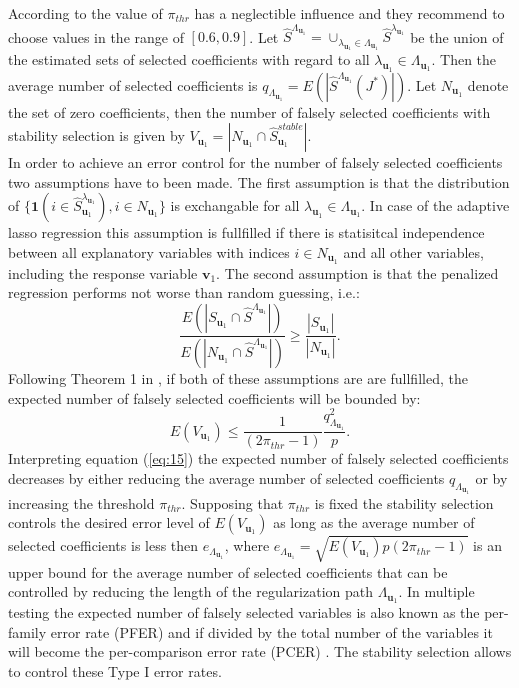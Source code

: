 According to \citet{Meinshausen2010} the value of $\pi_{thr}$ has a neglectible influence and they recommend to choose values in the range of $[0.6,0.9]$. Let $\hat{S}^{\Lambda_{\mathbf{u}_{1}}}= \cup_{\lambda_{\mathbf{u}_{1}} \in \Lambda_{\mathbf{u}_{1}}} \hat{S}^{\lambda_{\mathbf{u}_{1}}}$ be
the union of the estimated sets of selected coefficients with regard to all $\lambda_{\mathbf{u}_{1}} \in \Lambda_{\mathbf{u}_{1}}$.
Then the average number of selected coefficients is $q_{\Lambda_{\mathbf{u}_{1}}}=E(|\hat{S}^{\Lambda_{\mathbf{u}_{1}}}(J^{*})|)$. 
Let $N_{\mathbf{u}_{1}}$ denote the set of zero coefficients, then the number of falsely selected coefficients with stability selection is given by $V_{\mathbf{u}_{1}}=|N_{\mathbf{u}_{1}}\cap\hat{S}_{\mathbf{u}_{1}}^{stable}|$. \\
In order to achieve an error control for the number of falsely selected coefficients two assumptions have to been made. The first assumption is that the distribution of $\{\mathbf{1}(i \in \hat{S}^{\lambda_{\mathbf{u}_{1}}}_{\mathbf{u}_{1}}),i \in N_{\mathbf{u}_{1}}\}$ is exchangable for all $\lambda_{\mathbf{u}_{1}} \in \Lambda_{\mathbf{u}_{1}}$. In case of the adaptive lasso regression this assumption is fullfilled if there is statisitcal independence between all explanatory variables with indices $i \in N_{\mathbf{u}_{1}}$ and all other variables, including the response variable $\mathbf{v}_{1}$. The second assumption is that the penalized regression performs not worse than random guessing, i.e.: 
\begin{equation}
\frac{E(|S_{\mathbf{u}_{1}}\cap\hat{S}^{\Lambda_{\mathbf{u}_{1}}}|)}{E(|N_{\mathbf{u}_{1}}\cap\hat{S}^{\Lambda_{\mathbf{u}_{1}}}|)}\geq
\frac{|S_{\mathbf{u}_{1}}|}{|N_{\mathbf{u}_{1}}|}. 
\end{equation}
Following Theorem 1 in \citet{Meinshausen2010}, if both of these assumptions are are fullfilled, the expected number of falsely selected coefficients will be bounded by:
\begin{equation}
E(V_{\mathbf{u}_{1}}) \leq \frac{1}{(2\pi_{thr}-1)} \frac{q^{2}_{\Lambda_{\mathbf{u}_{1}}}}{p}.
\label{eq:15}
\end{equation}
Interpreting equation (\ref{eq:15}) the expected number of falsely selected coefficients decreases by either reducing the average number of selected coefficients $q_{\Lambda_{\mathbf{u}_{1}}}$ or by increasing the threshold $\pi_{thr}$. Supposing that $\pi_{thr}$ is fixed the stability selection controls the desired error level of $E(V_{\mathbf{u}_{1}})$ as long as the average number of selected coefficients is less then $e_{\Lambda_{\mathbf{u}_{1}}}$, where $e_{\Lambda_{\mathbf{u}_{1}}} = \sqrt{E(V_{\mathbf{u}_{1}})p(2\pi_{thr}-1)}$ is an upper bound for the average number of selected coefficients that can be controlled by reducing the length of the regularization path $\Lambda_{\mathbf{u}_{1}}$. In multiple testing the expected number of falsely selected variables is also known as the per-family error rate (PFER) and if divided by the total number of the variables it will become the per-comparison error rate (PCER) \cite{Dudoit2003}. The stability selection allows to control these Type I error rates. 

